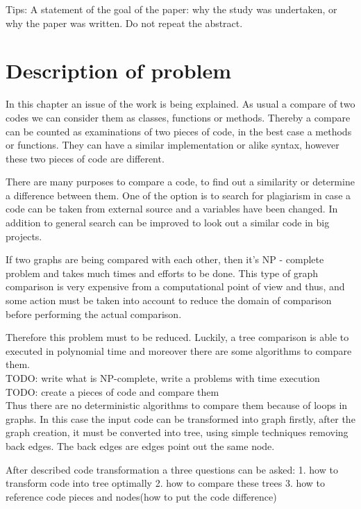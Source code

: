 \documentclass{report}
\begin{document}
Tips:
A statement of the goal of the paper: why the study was undertaken, or why the paper was written. Do not repeat the abstract. 

 

\newpage	
\chapter{Description of problem}
\label{cha:Description}

In this chapter an issue of the work is being explained. As usual a compare of two codes we can consider them as classes, functions or methods. Thereby a compare can be counted as examinations of two pieces of code, in the best case a methods or functions. They can have a similar implementation or alike syntax, however these two pieces of code are different.

There are many purposes to compare a code, to find out a similarity or determine a difference between them. One of the option is to search for plagiarism in case a code can be taken from external source and a variables have been changed. In addition to general search can be improved to look out a similar code in big projects.

If two graphs are being compared with each other, then it's NP - complete problem and takes much times and efforts to be done. 
This type of graph comparison is very expensive from a computational point of view and thus, and some action must be taken into account to reduce the domain of comparison before performing the actual comparison.

Therefore this problem must to be reduced. Luckily, a tree comparison is able to executed in polynomial time and moreover there are some algorithms to compare them.
\\
TODO: write what is NP-complete, write a problems with time execution \\
TODO: create a pieces of code and compare them
\\

Thus there are no deterministic algorithms to compare them because of loops in graphs. In this case the input code can be transformed into graph firstly, after the graph creation, it must be converted into tree, using simple techniques removing back edges. The back edges are edges point out the same node. 

After described code transformation a three questions can be asked:
 1. how to transform code into tree optimally
 2. how to compare these trees
 3. how to reference code pieces and nodes(how to put the code difference) 
\end{document}
